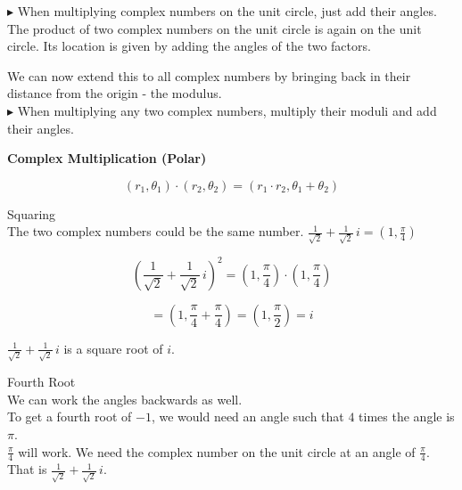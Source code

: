 \documentclass{ximera}
\begin{document}
 

\textcolor{red!80!black}{$\blacktriangleright$} When multiplying complex numbers on the unit circle, just add their angles. \\




The product of two complex numbers on the unit circle is again on the unit circle. Its location is given by adding the angles of the two factors.


We can now extend this to all complex numbers by bringing back in their distance from the origin - the modulus. \\




\textcolor{red!80!black}{$\blacktriangleright$} When multiplying any two complex numbers, multiply their moduli and add their angles.



\begin{theorem}  \textbf{\textcolor{green!50!black}{Complex Multiplication (Polar)}}

\[  (r_1, \theta_1) \cdot (r_2, \theta_2) = (r_1 \cdot r_2, \theta_1 + \theta_2)              \]


\end{theorem}




\begin{example}  Squaring \\


The two complex numbers could be the same number. $\frac{1}{\sqrt{2}} + \frac{1}{\sqrt{2}} \, i = \left(1, \frac{\pi}{4} \right)$


\[
\left( \frac{1}{\sqrt{2}} + \frac{1}{\sqrt{2}} \, i \right)^2 = \left(1, \frac{\pi}{4} \right) \cdot \left(1, \frac{\pi}{4} \right)
\]

\[
= \left(1, \frac{\pi}{4} + \frac{\pi}{4} \right) = \left( 1, \frac{\pi}{2} \right) = i
\]




$\frac{1}{\sqrt{2}} + \frac{1}{\sqrt{2}} \, i$ is a square root of $i$.


\end{example}







\begin{example}  Fourth Root \\


We can work the angles backwards as well.  \\

To get a fourth root of $-1$, we would need an angle such that $4$ times the angle is $\pi$.    \\

$\frac{\pi}{4}$ will work.  We need the complex number on the unit circle at an angle of $\frac{\pi}{4}$.  That is $\frac{1}{\sqrt{2}} + \frac{1}{\sqrt{2}} \, i$.


\end{example}
\end{document}
